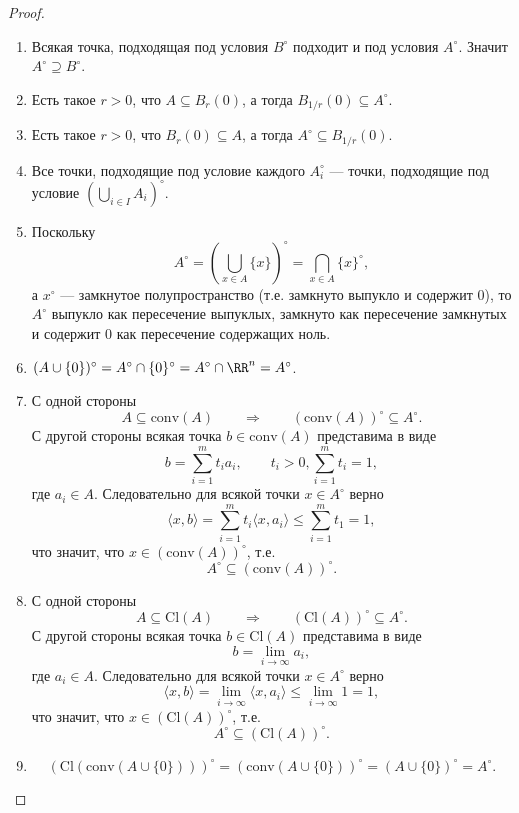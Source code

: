\documentclass[12pt,a4paper]{article}
\newcommand{\Cl}{\ensuremath{\mathrm{Cl}}\xspace}
\newcommand{\conv}{\ensuremath{\mathrm{conv}}\xspace}
\begin{document}
    \begin{proof}\ 
        \begin{enumerate}
            \item Всякая точка, подходящая под условия $B^\circ$ подходит и под условия $A^\circ$. Значит $A^\circ \supseteq B^\circ$.
            \item Есть такое $r > 0$, что $A \subseteq B_r(0)$, а тогда $B_{1/r}(0) \subseteq A^\circ$.
            \item Есть такое $r > 0$, что $B_r(0) \subseteq A$, а тогда $A^\circ \subseteq B_{1/r}(0)$.
            \item Все точки, подходящие под условие каждого $A_i^\circ$ --- точки, подходящие под условие $\left(\bigcup_{i \in I} A_i\right)^\circ$.
            \item Поскольку
                \[A^\circ = \left(\bigcup_{x \in A} \{x\}\right)^\circ = \bigcap_{x \in A} \{x\}^\circ,\]
                а $x^\circ$ --- замкнутое полупространство (т.е. замкнуто выпукло и содержит $0$), то $A^\circ$ выпукло как пересечение выпуклых, замкнуто как пересечение замкнутых и содержит $0$ как пересечение содержащих ноль.
            \item $(A \cup \{0\})^\circ = A^\circ \cap \{0\}^\circ = A^\circ \cap \RR^n = A^\circ$.
            \item С одной стороны
                \[A \subseteq \conv(A) \qquad \Longrightarrow \qquad (\conv(A))^\circ \subseteq A^\circ.\]
                С другой стороны всякая точка $b \in \conv(A)$ представима в виде
                \[b = \sum_{i=1}^m t_i a_i, \qquad t_i > 0, \sum_{i=1}^m t_i = 1,\]
                где $a_i \in A$. Следовательно для всякой точки $x \in A^\circ$ верно
                \[\langle x, b \rangle = \sum_{i=1}^m t_i \langle x, a_i \rangle \leqslant \sum_{i=1}^m t_1 = 1,\]
                что значит, что $x \in (\conv(A))^\circ$, т.е.
                \[A^\circ \subseteq (\conv(A))^\circ.\]
            \item С одной стороны
                \[A \subseteq \Cl(A) \qquad \Longrightarrow \qquad (\Cl(A))^\circ \subseteq A^\circ.\]
                С другой стороны всякая точка $b \in \Cl(A)$ представима в виде
                \[b = \lim_{i \to \infty} a_i,\]
                где $a_i \in A$. Следовательно для всякой точки $x \in A^\circ$ верно
                \[\langle x, b \rangle = \lim_{i \to \infty} \langle x, a_i \rangle \leqslant \lim_{i \to \infty} 1 = 1,\]
                что значит, что $x \in (\Cl(A))^\circ$, т.е.
                \[A^\circ \subseteq (\Cl(A))^\circ.\]
            \item \[(\Cl(\conv(A \cup \{0\})))^\circ = (\conv(A \cup \{0\}))^\circ = (A \cup \{0\})^\circ = A^\circ.\]
        \end{enumerate}
    \end{proof}
\end{document}
